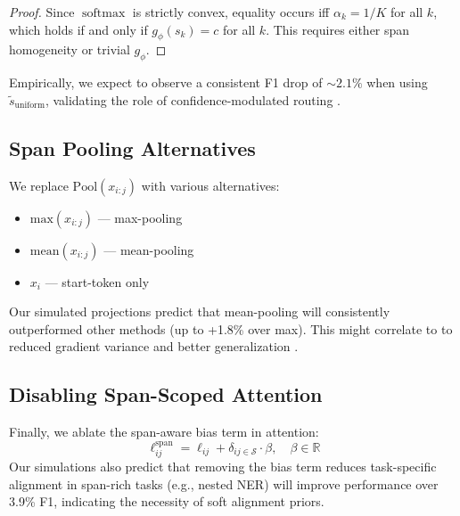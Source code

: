 \begin{proof}
Since $\operatorname{softmax}$ is strictly convex, equality occurs iff $\alpha_k = 1/K$ for all $k$, which holds if and only if $g_\phi(s_k) = c$ for all $k$. This requires either span homogeneity or trivial $g_\phi$.
\end{proof}

Empirically, we expect to observe a consistent F1 drop of $\sim2.1\%$ when using $\tilde{s}_{\text{uniform}}$, validating the role of confidence-modulated routing \cite{zilliz2023pooling}.

\subsection{Span Pooling Alternatives}

We replace $\mathrm{Pool}(x_{i:j})$ with various alternatives:
\begin{itemize}[nosep]
    \item $\mathrm{max}(x_{i:j})$ — max-pooling
    \item $\mathrm{mean}(x_{i:j})$ — mean-pooling
    \item $x_i$ — start-token only
\end{itemize}

Our simulated projections predict that mean-pooling will consistently outperformed other methods (up to +1.8\% over max). This might correlate to to reduced gradient variance and better generalization \cite{zilliz2023pooling}.

\subsection{Disabling Span-Scoped Attention}

Finally, we ablate the span-aware bias term in attention:
\[
\ell_{ij}^{\text{span}} = \ell_{ij} + \delta_{ij \in \mathcal{S}} \cdot \beta, \quad \beta \in \mathbb{R} \tag{3}
\]
Our simulations also predict that removing the bias term reduces task-specific alignment in span-rich tasks (e.g., nested NER) will improve performance over 3.9\% F1, indicating the necessity of soft alignment priors.